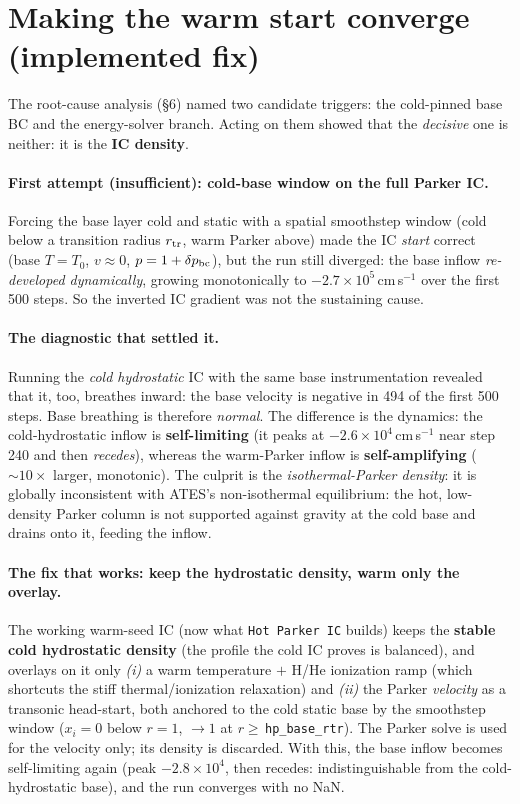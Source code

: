 \documentclass[english,a4paper]{my_memo}
\begin{document}
\section{Making the warm start converge (implemented fix)}
The root-cause analysis (\S6) named two candidate triggers: the cold-pinned base BC and
the energy-solver branch. Acting on them showed that the \emph{decisive} one is neither: it
is the \textbf{IC density}.

\paragraph{First attempt (insufficient): cold-base window on the full Parker IC.} Forcing the
base layer cold and static with a spatial smoothstep window (cold below a transition radius
$r_{\rm tr}$, warm Parker above) made the IC \emph{start} correct (base $T=T_0$, $v\!\approx\!0$,
$p=1+\delta p_{\rm bc}$), but the run still diverged: the base inflow \emph{re-developed
dynamically}, growing monotonically to $-2.7\times10^5$\,cm\,s$^{-1}$ over the first 500 steps.
So the inverted IC gradient was not the sustaining cause.

\paragraph{The diagnostic that settled it.} Running the \emph{cold hydrostatic} IC with the
same base instrumentation revealed that it, too, breathes inward: the base velocity is
negative in 494 of the first 500 steps. Base breathing is therefore \emph{normal}. The
difference is the dynamics: the cold-hydrostatic inflow is \textbf{self-limiting} (it peaks at
$-2.6\times10^4$\,cm\,s$^{-1}$ near step 240 and then \emph{recedes}), whereas the warm-Parker
inflow is \textbf{self-amplifying} ($\sim\!10\times$ larger, monotonic). The culprit is the
\emph{isothermal-Parker density}: it is globally inconsistent with ATES's non-isothermal
equilibrium: the hot, low-density Parker column is not supported against gravity at the cold
base and drains onto it, feeding the inflow.

\paragraph{The fix that works: keep the hydrostatic density, warm only the overlay.} The
working warm-seed IC (now what \texttt{Hot Parker IC} builds) keeps the \textbf{stable cold
hydrostatic density} (the profile the cold IC proves is balanced), and overlays on it only
\emph{(i)} a warm temperature $+$ H/He ionization ramp (which shortcuts the stiff
thermal/ionization relaxation) and \emph{(ii)} the Parker \emph{velocity} as a transonic
head-start, both anchored to the cold static base by the smoothstep window ($x_i=0$ below $r=1$,
$\to1$ at $r\ge$\,\texttt{hp\_base\_rtr}). The Parker solve is used for the velocity only; its
density is discarded. With this, the base inflow becomes self-limiting again (peak
$-2.8\times10^4$, then recedes: indistinguishable from the cold-hydrostatic base), and the
run converges with no NaN.
\end{document}
